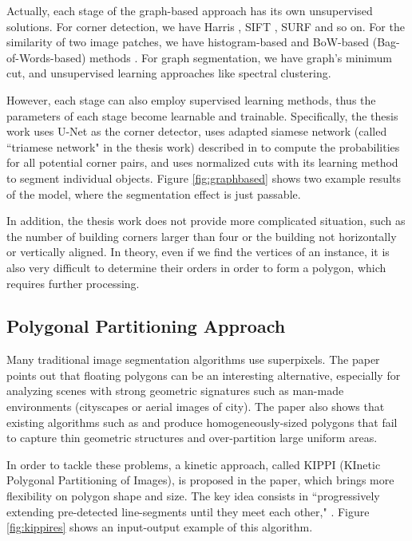 Actually, each stage of the graph-based approach has its own unsupervised solutions. For corner detection, we have Harris \cite{harris}, SIFT \cite{sift}, SURF \cite{surf} and so on. For the similarity of two image patches, we have histogram-based \cite{histbook} and BoW-based (Bag-of-Words-based) methods \cite{bow}. For graph segmentation, we have graph's minimum cut, and unsupervised learning approaches like spectral clustering.

However, each stage can also employ supervised learning methods, thus the parameters of each stage become learnable and trainable. Specifically, the thesis work \cite{msnadine} uses U-Net \cite{unet} as the corner detector, uses adapted siamese network (called ``triamese network" in the thesis work) described in \cite{siamese} to compute the probabilities for all potential corner pairs, and uses normalized cuts \cite{normcut} with its learning method \cite{normcutlearn} to segment individual objects. Figure \ref{fig:graphbased} shows two example results of the model, where the segmentation effect is just passable.

In addition, the thesis work does not provide more complicated situation, such as the number of building corners larger than four or the building not horizontally or vertically aligned. In theory, even if we find the vertices of an instance, it is also very difficult to determine their orders in order to form a polygon, which requires further processing.



\subsection{Polygonal Partitioning Approach}\label{ppapp}
Many traditional image segmentation algorithms use superpixels. The paper \cite{kippi} points out that floating polygons can be an interesting alternative, especially for analyzing scenes with strong geometric signatures such as man-made environments (cityscapes or aerial images of city). The paper also shows that existing algorithms such as \cite{forsytheimgseg} and \cite{duanimgseg} produce homogeneously-sized polygons that fail to capture thin geometric structures and over-partition large uniform areas.

In order to tackle these problems, a kinetic approach, called KIPPI (KInetic Polygonal Partitioning of Images), is proposed in the paper, which brings more flexibility on polygon shape and size. The key idea consists in ``progressively extending pre-detected line-segments until they meet each other," \cite{kippi}. Figure \ref{fig:kippires} shows an input-output example of this algorithm.

